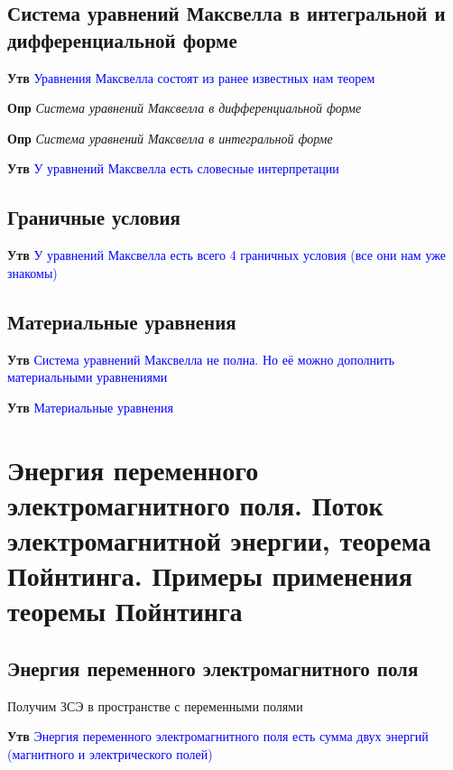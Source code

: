 \documentclass[a4paper, 14pt]{article}
\begin{document}
    \subsection{Система уравнений Максвелла в интегральной и дифференциальной форме}
    
    \textbf{Утв} \textcolor{blue}{Уравнения Максвелла состоят из ранее известных нам теорем}
    
    \textbf{Опр} \textit{Система уравнений Максвелла в дифференциальной форме}
    
    \textbf{Опр} \textit{Система уравнений Максвелла в интегральной форме}
    
    \textbf{Утв} \textcolor{blue}{У уравнений Максвелла есть словесные интерпретации}
    
    \subsection{Граничные условия}
    
    \textbf{Утв} \textcolor{blue}{У уравнений Максвелла есть всего 4 граничных условия (все они нам уже знакомы)}
    
    \subsection{Материальные уравнения}
    
    \textbf{Утв} \textcolor{blue}{Система уравнений Максвелла не полна.
    Но её можно дополнить материальными уравнениями}
    
    \textbf{Утв} \textcolor{blue}{Материальные уравнения}
    
    \section{Энергия переменного электромагнитного поля.
    Поток электромагнитной энергии, теорема Пойнтинга.
    Примеры применения теоремы Пойнтинга}
    
    \subsection{Энергия переменного электромагнитного поля}
    
    Получим ЗСЭ в пространстве с переменными полями
    
    \textbf{Утв} \textcolor{blue}{Энергия переменного электромагнитного поля есть сумма двух энергий (магнитного и
    электрического полей)}
    
\end{document}
